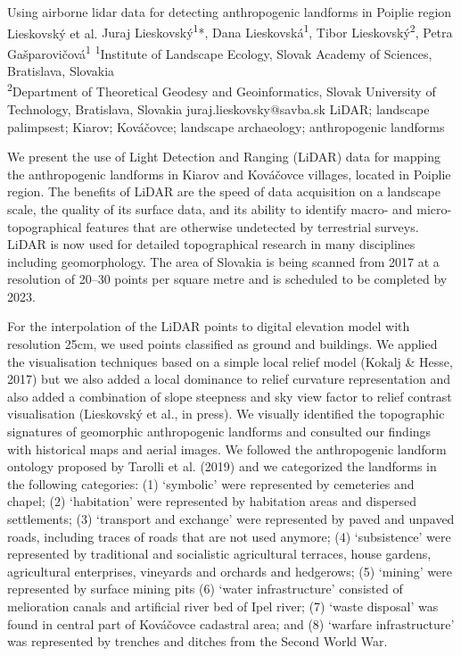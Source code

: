 
\abstract
{Using airborne lidar data for detecting anthropogenic landforms in Poiplie region} %
{Lieskovský et al.} %
{Juraj Lieskovský\textsuperscript{1}*, Dana Lieskovská\textsuperscript{1}, Tibor Lieskovský\textsuperscript{2}, Petra Gašparovičová\textsuperscript{1}} %
{\TLtag} %
{\textsuperscript{1}Institute of Landscape Ecology, Slovak Academy of Sciences, Bratislava, Slovakia\\
\textsuperscript{2}Department of Theoretical Geodesy and Geoinformatics, Slovak University of Technology, Bratislava, Slovakia
} %
{juraj.lieskovsky@savba.sk}  %
{LiDAR; landscape palimpsest; Kiarov; Kováčovce; landscape archaeology; anthropogenic landforms}%
{We present the use of Light Detection and Ranging  (LiDAR) data for mapping the anthropogenic landforms in Kiarov and Kováčovce villages, located in Poiplie region. The benefits of LiDAR are the speed of data acquisition on a landscape scale, the quality of its surface data, and its ability to identify macro- and micro-topographical features that are otherwise undetected by terrestrial surveys. LiDAR is now used for detailed topographical research in many disciplines including geomorphology. The area of Slovakia is being scanned from 2017 at a resolution of 20–30 points per square metre and is scheduled to be completed by 2023. 
	
For the interpolation of the LiDAR points to digital elevation model with resolution 25cm, we used points classified as ground and buildings. We applied the visualisation techniques based on a simple local relief model (Kokalj \& Hesse, 2017) but we also added a local dominance to relief curvature representation and also added a combination of slope steepness and sky view factor to relief contrast visualisation (Lieskovský et al., in press). We visually identified the topographic signatures of geomorphic anthropogenic landforms and consulted our findings with historical maps and aerial images. We followed the anthropogenic landform ontology proposed by Tarolli et al. (2019) and we categorized the landforms in the following categories: (1) ‘symbolic’ were represented by cemeteries and chapel; (2) ‘habitation’ were represented by habitation areas and dispersed settlements; (3) ‘transport and exchange’ were represented by paved and unpaved roads, including traces of roads that are not used anymore; (4) ‘subsistence’ were represented by traditional and socialistic agricultural terraces, house gardens, agricultural enterprises, vineyards and orchards and  hedgerows; (5) ‘mining’ were represented by surface mining pits (6) ‘water infrastructure’ consisted of melioration canals and artificial river bed of Ipel river; (7) ‘waste disposal’ was found in central part of Kováčovce cadastral area; and (8) ‘warfare infrastructure’ was represented by trenches and ditches from the Second World War.
}%
